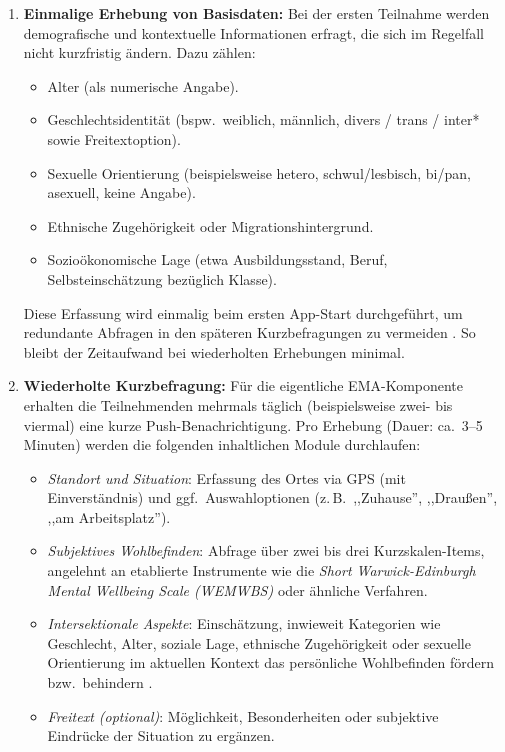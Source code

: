 \begin{enumerate}[label=(\Alph*)]
  \item \textbf{Einmalige Erhebung von Basisdaten:}  
  Bei der ersten Teilnahme werden demografische und kontextuelle Informationen erfragt, die sich im Regelfall nicht kurzfristig ändern. Dazu zählen:
  \begin{itemize}
    \item Alter (als numerische Angabe).
    \item Geschlechtsidentität (bspw.\ weiblich, männlich, divers / trans / inter* sowie Freitextoption).
    \item Sexuelle Orientierung (beispielsweise hetero, schwul/lesbisch, bi/pan, asexuell, keine Angabe).
    \item Ethnische Zugehörigkeit oder Migrationshintergrund.
    \item Sozioökonomische Lage (etwa Ausbildungsstand, Beruf, Selbsteinschätzung bezüglich Klasse).
  \end{itemize}
  Diese Erfassung wird einmalig beim ersten App-Start durchgeführt, um redundante Abfragen in den späteren Kurzbefragungen zu vermeiden \parencite{dillman_internet_2014}. So bleibt der Zeitaufwand bei wiederholten Erhebungen minimal.

  \item \textbf{Wiederholte Kurzbefragung:}  
  Für die eigentliche EMA-Komponente erhalten die Teilnehmenden mehrmals täglich (beispielsweise zwei- bis viermal) eine kurze Push-Benachrichtigung. Pro Erhebung (Dauer: ca.\ 3--5 Minuten) werden die folgenden inhaltlichen Module durchlaufen:
  \begin{itemize}
    \item \emph{Standort und Situation}: Erfassung des Ortes via GPS (mit Einverständnis) und ggf.\ Auswahloptionen (z.\,B.\ ,,Zuhause'', ,,Draußen'', ,,am Arbeitsplatz'').
    \item \emph{Subjektives Wohlbefinden}: Abfrage über zwei bis drei Kurzskalen-Items, angelehnt an etablierte Instrumente wie die \emph{Short Warwick-Edinburgh Mental Wellbeing Scale (WEMWBS)} \parencite{tennant_warwick-edinburgh_2007} oder ähnliche Verfahren. 
    \item \emph{Intersektionale Aspekte}: Einschätzung, inwieweit Kategorien wie Geschlecht, Alter, soziale Lage, ethnische Zugehörigkeit oder sexuelle Orientierung im aktuellen Kontext das persönliche Wohlbefinden fördern bzw.\ behindern \parencite{collins_black_2002, crenshaw_mapping_1991}. 
    \item \emph{Freitext (optional)}: Möglichkeit, Besonderheiten oder subjektive Eindrücke der Situation zu ergänzen.
  \end{itemize}
\end{enumerate}


